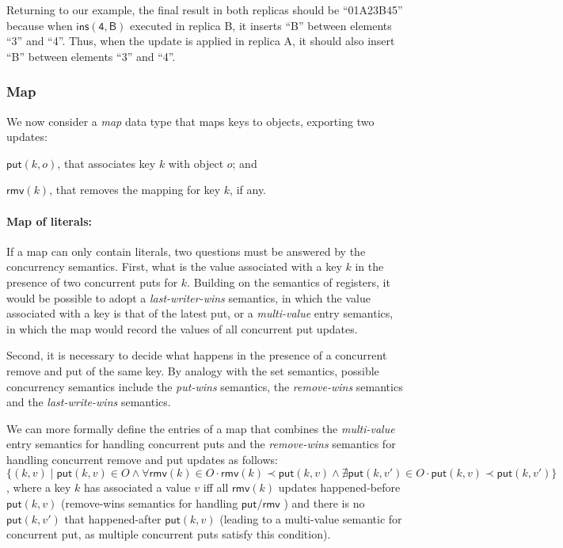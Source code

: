 \documentclass[11pt,a4paper]{article}
\def\land{\mathrel{\wedge}}
\begin{document}
Returning to our example, the final result in both replicas should be ``01A23B45'' because 
when $\mathsf{ins(4,B)}$ executed in replica B, it inserts ``B'' between 
elements ``3'' and ``4''. Thus, when the update is applied in replica A, it 
should also insert ``B'' between elements ``3'' and ``4''.

\subsubsection{Map}
We now consider a \emph{map} data type that maps keys to objects, exporting
two updates:
\begin{inparaenum}[(i)]
\item $\mathsf{put}(k,o)$, that associates key $k$ with object $o$; and  
\item $\mathsf{rmv}(k)$, that removes the mapping for key $k$, if any.
\end{inparaenum}

\paragraph{Map of literals:}
If a map can only contain literals, two questions must be answered
by the concurrency semantics.
First, what is the value associated with a key $k$ in the presence of
two concurrent puts for $k$. Building on the semantics of 
registers, it would be possible to adopt a \emph{last-writer-wins}
semantics, in which the value associated with a key is that of the 
latest put, or a \emph{multi-value} entry semantics, in which the map
would record the values of all concurrent put updates.

Second, it is necessary to decide what happens in the presence of a 
concurrent remove and put of the same key. 
By analogy with the set semantics, 
possible concurrency semantics include the \emph{put-wins}
semantics, the \emph{remove-wins} semantics and the \emph{last-write-wins}
semantics.

We can more formally define the entries of a map that combines the 
\emph{multi-value} entry semantics for handling concurrent puts and 
the \emph{remove-wins} semantics for handling concurrent remove and put updates
as follows:
$\{(k,v) \mid \mathsf{put}(k,v) \in O \land \forall \mathsf{rmv}(k) \in O \cdot \mathsf{rmv}(k) \prec \mathsf{put}(k,v) \land \nexists \mathsf{put}(k,v') \in O \cdot \mathsf{put}(k,v) \prec \mathsf{put}(k,v')\}$,
where a key $k$ has associated a value $v$ iff all $\mathsf{rmv}(k)$ updates happened-before
$\mathsf{put}(k,v)$ (remove-wins semantics for handling $\mathsf{put}$/$\mathsf{rmv}$ ) and
there is no $\mathsf{put}(k,v')$ that happened-after $\mathsf{put}(k,v)$ (leading to a multi-value
semantic for concurrent put, as multiple concurrent puts satisfy this condition).
\end{document}
